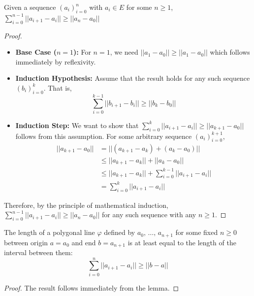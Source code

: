 \begin{lemma}
    \label{lemma:norm_sum_at_least_sum_norm}
    \leanok
    Given a sequence $(a_i)_{i=0}^{n}$ with $a_i \in E$ for some $n \geq 1$, $\sum_{i=0}^{n-1}||a_{i+1} - a_i|| \geq ||a_n - a_0||$
\end{lemma}
\begin{proof}
    \leanok
    \begin{itemize}
        \item \textbf{Base Case ($n=1$):}
        For $n=1$, we need $||a_1 - a_0|| \geq ||a_1 - a_0||$ which follows immediately by reflexivity.

        \item \textbf{Induction Hypothesis:}
        Assume that the result holds for any such sequence $(b_i)_{i=0}^k$. That is,
        \[
            \sum_{i=0}^{k-1}||b_{i+1} - b_i|| \geq ||b_k - b_0||
        \]

        \item \textbf{Induction Step:}
        We want to show that $\sum_{i=0}^{k}||a_{i+1} - a_i|| \geq ||a_{k+1} - a_0||$ follows from this assumption.
        For some arbitrary sequence  $(a_i)_{i=0}^{k+1}$,
        \begin{align*}
            ||a_{k+1} - a_0|| &=  ||(a_{k+1} - a_k) + (a_k - a_0)|| \\
            &\leq ||a_{k+1} - a_k|| + ||a_k - a_0|| \\
            &\leq ||a_{k+1} - a_k|| + \sum_{i=0}^{k-1}||a_{i+1} - a_i|| \\
            &= \sum_{i=0}^{k}||a_{i+1} - a_i||
        \end{align*}
    \end{itemize}

    Therefore, by the principle of mathematical induction, $\sum_{i=0}^{n-1}||a_{i+1} - a_i|| \geq ||a_n - a_0||$ for any such sequence with any $n \geq 1$.
\end{proof}

\begin{theorem}
    \label{thm:polygonal_line_length_at_least_interval_length}
    \leanok
    The length of a polygonal line $\varphi$ defined by $a_0,\, \dots,\, a_{n + 1}$ for some fixed $n \geq 0$
    between origin $a = a_0$ and end $b = a_{n+1}$ is at least equal to the length of the interval between them:
    \[
        \sum_{i=0}^{n}||a_{i+1} - a_i|| \geq ||b - a||
    \]
\end{theorem}
\begin{proof}
    \leanok
    The result follows immediately from the lemma.
\end{proof}
